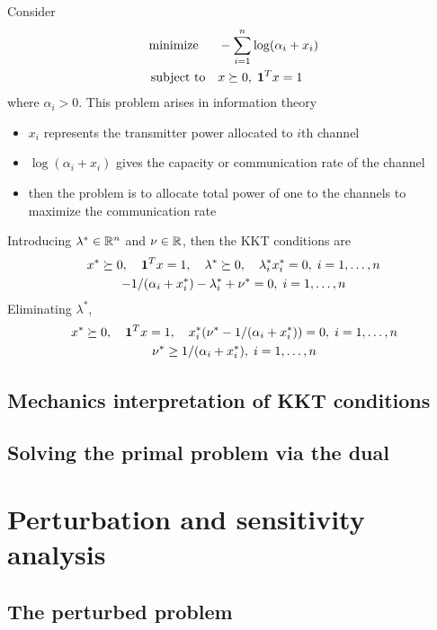 \begin{example}
  Consider
  \begin{align*}
    \text{minimize\;\;}\quad& -\sum_{i=1}^n\log(\alpha_i+x_i)\\
    \text{subject to}  \quad& x\succeq 0,\;\mathbf 1^Tx=1
  \end{align*}
  where $\alpha_i>0$.
  This problem arises in information theory
  \begin{itemize}
    \item $x_i$ represents the transmitter power allocated to $i$th channel
    \item $\log(\alpha_i+x_i)$ gives the capacity or communication rate of the channel
    \item then the problem is to allocate total power of one to the channels to maximize the communication rate
  \end{itemize}
  Introducing $\lambda^\ast\in\mathbb{R}^n$ and $\nu\in\mathbb{R}$, then the KKT conditions are
  \begin{gather*}
    x^\ast\succeq 0,\quad\mathbf 1^Tx=1,\quad\lambda^\ast\succeq 0,\quad\lambda_i^\ast x_i^\ast=0,\;i=1,\dots,n\\
    -1/(\alpha_i+x_i^\ast)-\lambda_i^\ast+\nu^\ast=0,\;i=1,\dots,n
  \end{gather*}
  Eliminating $\lambda^\ast$,
  \begin{gather*}
    x^\ast\succeq 0,\quad\mathbf 1^Tx=1,\quad x_i^\ast(\nu^\ast-1/(\alpha_i+x_i^\ast))=0,\;i=1,\dots,n\\
    \nu^\ast\ge 1/(\alpha_i+x_i^\ast),\;i=1,\dots,n
  \end{gather*}
\end{example}

\subsection{Mechanics interpretation of KKT conditions}
\subsection{Solving the primal problem via the dual}

\section{Perturbation and sensitivity analysis}
\subsection{The perturbed problem}
